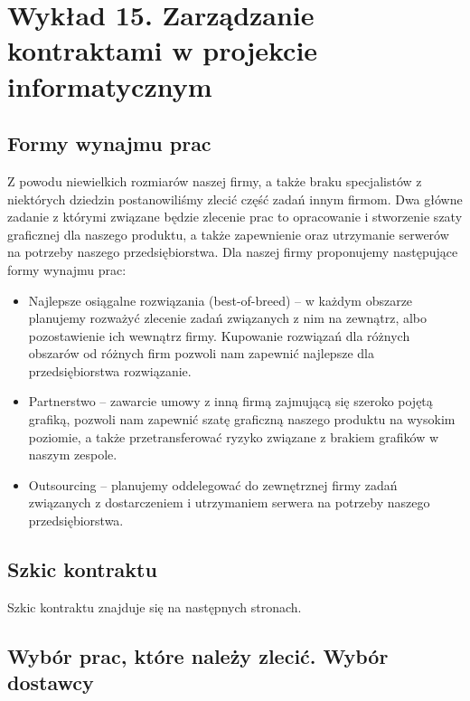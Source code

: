 ﻿\chapter{Wykład 15. Zarządzanie kontraktami w projekcie informatycznym}

\section{Formy wynajmu prac}

Z powodu niewielkich rozmiarów naszej firmy, a także braku specjalistów z niektórych dziedzin postanowiliśmy zlecić część zadań innym firmom. Dwa główne zadanie z którymi związane będzie zlecenie prac to opracowanie i stworzenie szaty graficznej dla naszego produktu, a także zapewnienie oraz utrzymanie serwerów na potrzeby naszego przedsiębiorstwa. Dla naszej firmy proponujemy następujące formy wynajmu prac:
\begin{itemize}
\item Najlepsze osiągalne rozwiązania (best-of-breed) – w każdym obszarze planujemy rozważyć zlecenie zadań związanych z nim na zewnątrz, albo pozostawienie ich wewnątrz firmy. Kupowanie rozwiązań dla różnych obszarów od różnych firm pozwoli nam zapewnić najlepsze dla przedsiębiorstwa rozwiązanie.
\item Partnerstwo – zawarcie umowy z inną firmą zajmującą się szeroko pojętą grafiką, pozwoli nam zapewnić szatę graficzną naszego produktu na wysokim poziomie, a także przetransferować ryzyko związane z brakiem grafików w naszym zespole.
\item Outsourcing – planujemy oddelegować do zewnętrznej firmy zadań związanych z dostarczeniem i utrzymaniem serwera na potrzeby naszego przedsiębiorstwa.
\end{itemize}


\section{Szkic kontraktu}

Szkic kontraktu znajduje się na następnych stronach.



\clearpage


\section{Wybór prac, które należy zlecić. Wybór dostawcy}

